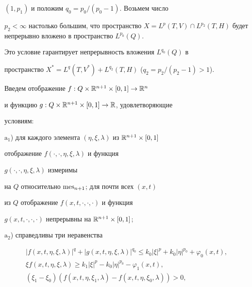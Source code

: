 $(1,p_1)$ и положим $q_0=p_0/(p_0-1)$. Возьмем число 


$p_2<\infty$ настолько большим, что пространство $X=L^p(T,V)\cap 


L^{p_2}(T,H)$ будет непрерывно вложено в пространство $L^{p_0}(Q)$. 


Это условие гарантирует непрерывность вложения $L^{q_0}(Q)$ в 


пространство $X^*=L^q(T,V^*)+L^{q_2}(T,H)$ ($q_2=p_2/(p_2-1)>1$). 


 


Введем отображение $f:Q\times\Bbb R^{n+1}\times[0,1]\to\Bbb R^n$ 


и функцию $g:Q\times\Bbb R^{n+1}\times[0,1]\to\Bbb R$, удовлетворяющие 


условиям: 


 


$\mathrm a_1$) для каждого элемента $(\eta,\xi,\lambda)$ из $\Bbb 


R^{n+1}\times[0,1]$ 


отображение $f(\cdot,\cdot,\eta,\xi,\lambda)$ и функция 


$g(\cdot,\cdot,\eta,\xi,\lambda)$ измеримы 


на $Q$ относительно $\operatorname{mes}_{n+1}$; для почти всех $(x,t)$ 


из $Q$ отображение $f(x,t,\cdot,\cdot,\cdot)$ и функция 


$g(x,t,\cdot,\cdot,\cdot)$ непрерывны на $\Bbb R^{n+1}\times[0,1]$; 


 


$\mathrm a_2$) справедливы три неравенства 


\begin{gather} 


|f(x,t,\eta,\xi,\lambda)|^q+|g(x,t,\eta,\xi,\lambda)|^{q_0}\le 


k_0|\xi|^p+k_0|\eta|^{p_0}+\varphi_0(x,t), \\ 


% 


\xi f(x,t,\eta,\xi,\lambda)\ge k_1|\xi|^p- 


k_0|\eta|^{p_0}-\varphi_1(x,t), \\ 


% 


(\xi_1-\xi_0)(f(x,t,\eta,\xi_1,\lambda)- 


f(x,t,\eta,\xi_0,\lambda))>0, 


\end{gather} 


